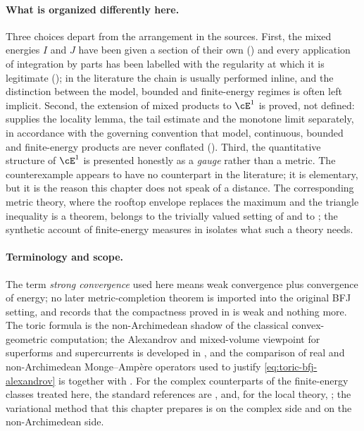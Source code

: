 \paragraph{What is organized differently here.}
Three choices depart from the arrangement in the sources.  First, the mixed
energies \(I\) and \(J\) have been given a section of their own
() and every application of integration by parts has
been labelled with the regularity at which it is legitimate
(); in the literature the chain is usually
performed inline, and the distinction between the model, bounded and
finite-energy regimes is often left implicit.  Second, the extension of mixed
products to \(\cE^1\) is proved, not defined: 
supplies the locality lemma, the tail estimate and the monotone limit
separately, in accordance with the governing convention that model,
continuous, bounded and finite-energy products are never conflated
().  Third, the quantitative structure of
\(\cE^1\) is presented honestly as a \emph{gauge} rather than a metric.  The
counterexample  appears to have no counterpart
in the literature; it is elementary, but it is the reason this chapter does
not speak of a distance.  The corresponding metric theory, where the rooftop
envelope replaces the maximum and the triangle inequality is a theorem,
belongs to the trivially valued setting of
 and to \cite[\S12]{BJ22}; the synthetic
account of finite-energy measures in \cite{BJ25FiniteEnergy} isolates what
such a theory needs.

\paragraph{Terminology and scope.}
The term \emph{strong convergence} used here means weak convergence plus
convergence of energy; no later metric-completion theorem is imported into
the original BFJ setting, and  records
that the compactness proved in  is weak and
nothing more.  The toric formula  is the
non-Archimedean shadow of the classical convex-geometric computation; the
Alexandrov and mixed-volume viewpoint for superforms and supercurrents is
developed in \cite{Ber26Convex}, and the comparison of real and
non-Archimedean Monge--Amp\`ere operators used to justify
\eqref{eq:toric-bfj-alexandrov} is \cite{Vil20} together with
\cite{BGJKK25}.  For the complex counterparts of the finite-energy classes
treated here, the standard references are \cite{GZ07}, \cite{BEGZ10} and,
for the local theory, \cite{Ceg98,Ceg04}; the variational method that this
chapter prepares is \cite{BBGZ13} on the complex side and
\cite[\S\S7--8]{BFJ15} on the non-Archimedean side.

